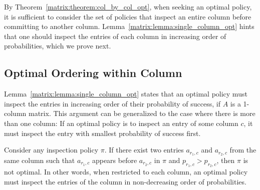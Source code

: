  By Theorem~\ref{matrix:theorem:col_by_col_opt}, when seeking an optimal policy, it is sufficient to consider the set of policies that inspect an entire column before committing to another column. Lemma~\ref{matrix:lemma:single_column_opt} hints that one should inspect the entries of each column in increasing order of probabilities, which we prove next.


 \subsection{Optimal Ordering within Column} 

 Lemma~\ref{matrix:lemma:single_column_opt} states that
 an optimal policy must inspect the entries in increasing order of their probability of success, if $A$ is a 1-column matrix.
 This argument can be generalized to the case where there is more than one column: If an optimal policy is to inspect an entry of some column $c$, it must inspect the entry with smallest probability of success first. 
 \begin{theorem} \label{matrix:theorem:within_column_opt}
 	Consider any inspection policy $\pi$.
 	If there exist two entries $a_{r_1,c}$ and $a_{r_2,c}$ from the same column such that $a_{r_1,c}$ appears before $a_{r_2,c}$ in $\pi$ and $p_{r_1,c} > p_{r_2,c}$, then $\pi$ is not optimal. 
 	In other words, when restricted to each column, an optimal policy must inspect the entries of the column in non-decreasing order of probabilities.
 \end{theorem}
